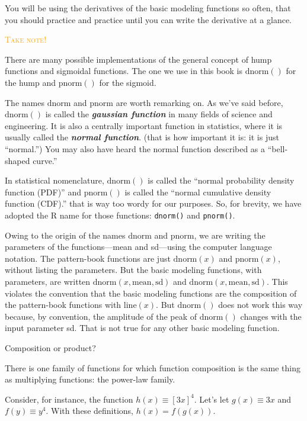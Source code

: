 \documentclass[
  letterpaper,
  DIV=11,
  numbers=noendperiod,
  oneside]{scrreprt}
\newenvironment{takenote}%
{%
\textcolor{orange}{\hrulefill}%
  \par\vspace{.3\baselineskip}%
  \textcolor{orange}{\scshape Take note!}%
  \par\vspace{\baselineskip}%
}%
{\textcolor{orange}{\hrulefill}}
\renewcommand{\line}{\text{line}}
\newcommand{\pnorm}{\text{pnorm}}
\newcommand{\dnorm}{\text{dnorm}}
\begin{document}
You will be using the derivatives of the basic modeling functions so
often, that you should practice and practice until you can write the
derivative at a glance.

\begin{takenote}
There are many possible implementations of the general concept of hump
functions and sigmoidal functions. The one we use in this book is
\(\dnorm()\) for the hump and \(\pnorm()\) for the sigmoid.

The names \(\dnorm\) and \(\pnorm\) are worth remarking on. As we've
said before, \(\dnorm()\) is called the \textbf{\emph{gaussian
function}} in many fields of science and engineering. It is also a
centrally important function in statistics, where it is usually called
the \textbf{\emph{normal function}}. (that is how important it is: it is
just ``normal.'') You may also have heard the normal function described
as a ``bell-shaped curve.''

In statistical nomenclature, \(\dnorm()\) is called the ``normal
probability density function (PDF)'' and \(\pnorm()\) is called the
``normal cumulative density function (CDF).'' that is way too wordy for
our purposes. So, for brevity, we have adopted the R name for those
functions: \texttt{dnorm()} and \texttt{pnorm()}.

Owing to the origin of the names \(\dnorm\) and \(\pnorm\), we are
writing the parameters of the functions---mean and sd---using the
computer language notation. The pattern-book functions are just
\(\dnorm(x)\) and \(\pnorm(x)\), without listing the parameters. But the
basic modeling functions, with parameters, are written
\(\dnorm(x, \text{mean}, \text{sd})\) and
\(\dnorm(x, \text{mean}, \text{sd})\). This violates the convention that
the basic modeling functions are the composition of the pattern-book
functions with \(\line(x)\). But \(\dnorm()\) does not work this way
because, by convention, the amplitude of the peak of \(\dnorm()\)
changes with the input parameter sd. That is not true for any other
basic modeling function.

\end{takenote}

Composition or product?

There is one family of functions for which function composition is the
same thing as multiplying functions: the power-law family.

Consider, for instance, the function \(h(x) \equiv \left[3x\right]^4\).
Let's let \(g(x) \equiv 3x\) and \(f(y) \equiv y^4\). With these
definitions, \(h(x) = f(g(x))\).
\end{document}
